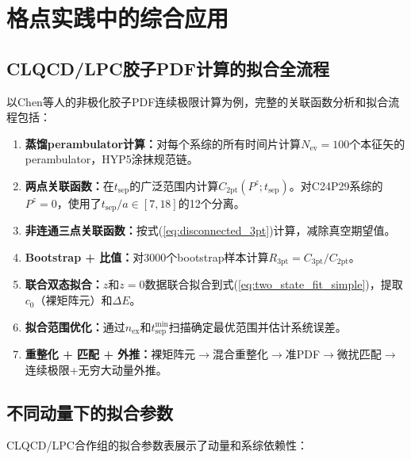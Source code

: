 \documentclass[12pt,a4paper]{ctexart}
\theoremstyle{definition}
\begin{document}
\section{格点实践中的综合应用}

\subsection{CLQCD/LPC胶子PDF计算的拟合全流程}

以Chen等人\cite{Chen2025gluon}的非极化胶子PDF连续极限计算为例，完整的关联函数分析和拟合流程包括：

\begin{enumerate}
    \item \textbf{蒸馏perambulator计算：}对每个系综的所有时间片计算$N_{\text{ev}} = 100$个本征矢的perambulator，HYP5涂抹规范链。

    \item \textbf{两点关联函数：}在$t_{\text{sep}}$的广泛范围内计算$C_{\text{2pt}}(P^z; t_{\text{sep}})$。对C24P29系综的$P^z = 0$，使用了$t_{\text{sep}}/a \in [7,18]$的12个分离。

    \item \textbf{非连通三点关联函数：}按式(\ref{eq:disconnected_3pt})计算，减除真空期望值。

    \item \textbf{Bootstrap + 比值：}对3000个bootstrap样本计算$R_{\text{3pt}} = C_{\text{3pt}}/C_{\text{2pt}}$。

    \item \textbf{联合双态拟合：}$z$和$z=0$数据联合拟合到式(\ref{eq:two_state_fit_simple})，提取$c_0$（裸矩阵元）和$\Delta E$。

    \item \textbf{拟合范围优化：}通过$n_{\text{ex}}$和$t_{\text{sep}}^{\text{min}}$扫描确定最优范围并估计系统误差。

    \item \textbf{重整化 + 匹配 + 外推：}裸矩阵元$\to$混合重整化$\to$准PDF$\to$微扰匹配$\to$连续极限+无穷大动量外推。
\end{enumerate}

\subsection{不同动量下的拟合参数}

CLQCD/LPC合作组的拟合参数表\cite{Chen2025gluon}展示了动量和系综依赖性：
\end{document}
